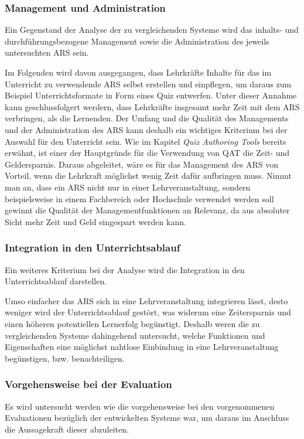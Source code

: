\documentclass[conference]{IEEEtran}
\begin{document}
\subsubsection{Management und Administration} 
Ein Gegenstand der Analyse der zu vergleichenden Systeme wird das inhalts- und durchführungsbezogene Management sowie die Administration des jeweils untersuchten ARS sein.

Im Folgenden wird davon ausgegangen, dass Lehrkräfte Inhalte für das im Unterricht zu verwendende ARS selbst erstellen und einpflegen, um daraus zum Beispiel Unterrichtsformate in Form eines Quiz entwerfen. Unter dieser Annahme kann geschlussfolgert werdern, dass Lehrkräfte insgesamt mehr Zeit mit dem ARS verbringen, als die Lernenden. Der Umfang und die Qualität des Managements und der Administration des ARS kann deshalb ein wichtiges Kriterium bei der Auswahl für den Unterricht sein. Wie im Kapitel \emph{Quiz Authoring Tools} bereits erwähnt, ist einer der Hauptgründe für die Verwendung von QAT die Zeit- und Geldersparnis. Daraus abgeleitet, wäre es für das Management des ARS von Vorteil, wenn die Lehrkraft möglichst wenig Zeit dafür aufbringen muss. Nimmt man an, dass ein ARS nicht nur in einer Lehrveranstaltung, sondern beispielsweise in einem Fachbereich oder Hochschule verwendet werden soll gewinnt die Qualität der Managementfunktionen an Relevanz, da aus absoluter Sicht mehr Zeit und Geld eingespart werden kann. 
\\
\subsubsection{Integration in den Unterrichtsablauf}
Ein weiteres Kriterium bei der Analyse wird die Integration in den Unterrichtsablauf darstellen.

Umso einfacher das ARS sich in eine Lehrveranstaltung integrieren lässt, desto weniger wird der Unterrichtsablauf gestört, was widerum eine Zeitersparnis und einen höheren potentiellen Lernerfolg begünstigt. Deshalb weren die zu vergleichenden Systeme dahingehend untersucht, welche Funktionen und Eigenschaften eine möglichst nahtlose Einbindung in eine Lehrveranstaltung begünstigen, bzw. benachteiligen.
\\
\subsubsection{Vorgehensweise bei der Evaluation}
Es wird untersucht werden wie die vorgehensweise bei den vorgenommenen Evaluationen bezüglich der entwickelten Systeme war, um daraus im Anschluss die Aussagekraft dieser abzuleiten.
\end{document}
